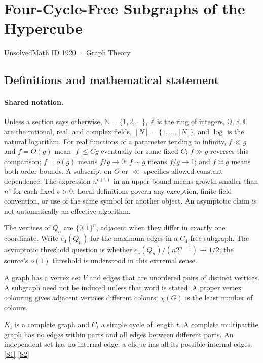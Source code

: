 \documentclass[11pt,a4paper]{article}
\newcommand{\N}{\mathbb{N}}
\newcommand{\Z}{\mathbb{Z}}
\newcommand{\Q}{\mathbb{Q}}
\newcommand{\R}{\mathbb{R}}
\newcommand{\C}{\mathbb{C}}
\newcommand{\sref}[2]{\hyperlink{source:#1:#2}{[S#2]}}
\begin{document}

\setcounter{section}{1919}

\section{Four-Cycle-Free Subgraphs of the Hypercube}\label{1920}

{\small\sffamily UnsolvedMath ID 1920 · Graph Theory}

\subsection{Definitions and mathematical statement}

\paragraph{Shared notation.}Unless a section says otherwise, $\N=\{1,2,\ldots\}$,
$\Z$ is the ring of integers, $\Q,\R,\C$ are the rational, real, and complex
fields, $[N]=\{1,\ldots,\lfloor N\rfloor\}$, and $\log$ is the natural
logarithm. For real functions of a parameter tending to infinity,
$f\ll g$ and $f=O(g)$ mean $|f|\leq Cg$ eventually for some fixed $C$;
$f\gg g$ reverses this comparison; $f=o(g)$ means $f/g\to0$;
$f\sim g$ means $f/g\to1$; and $f\asymp g$ means both order bounds.
A subscript on $O$ or $\ll$ specifies allowed constant dependence.
The expression $n^{o(1)}$ in an upper bound means growth smaller than
$n^\epsilon$ for each fixed $\epsilon>0$. Local definitions govern any
exception, finite-field convention, or use of the same symbol for another
object. An asymptotic claim is not automatically an effective algorithm.



The vertices of $Q_n$ are $\{0,1\}^n$, adjacent when they differ in exactly one coordinate. Write $e_4(Q_n)$ for the maximum edges in a $C_4$-free subgraph. The asymptotic threshold question is whether $e_4(Q_n)/(n2^{n-1})\to1/2$; the source's $o(1)$ threshold is understood in this extremal sense.

A graph has a vertex set $V$ and edges that are unordered pairs of distinct vertices. A subgraph need not be induced unless that word is stated. A proper vertex colouring gives adjacent vertices different colours; $\chi(G)$ is the least number of colours.

$K_t$ is a complete graph and $C_t$ a simple cycle of length $t$. A complete multipartite graph has no edges within parts and all edges between different parts. An independent set has no internal edge; a clique has all its possible internal edges. \sref{1920}{1} \sref{1920}{2}
\end{document}
